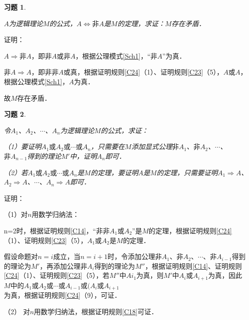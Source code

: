 \documentclass[12pt, a4paper, oneside]{book}
\newtheorem{exer}{习题}
\begin{document}
			\begin{exer}\label{exer9}
				\hfill\par
				$A$为逻辑理论$M$的公式，$A\Leftrightarrow \text{非}A$是$M$的定理，求证：$M$存在矛盾．
			\end{exer}
			证明：
			\par
			$A\Rightarrow \text{非}A$，即$\text{非}A\text{或}\text{非}A$，根据公理模式\ref{Sch1}，“$\text{非}A”$为真．
			\par
			$\text{非}A\Rightarrow A$，即$\text{非}\text{非}A\text{或}$真，根据证明规则\ref{C24}（1）、证明规则\ref{C23}（5），$A\text{或}A$，根据公理模式\ref{Sch1}，$A$为真．
			\par
			故$M$存在矛盾．
	
			\begin{exer}\label{exer10}
				\hfill\par
				令$A_1$、$A_2$、$\cdots$、$A_n$为逻辑理论$M$的公式，求证：
				\par
				（1）要证明$A_1\text{或}A_2\text{或}\cdots\text{或}A_n$，只需要在$M$添加显式公理$\text{非}A_1$、$\text{非}A_2$、$\cdots$、$\text{非}A_{n-1}$得到的理论$M'$中，证明$A_n$即可．
				\par
				（2）若$A_1\text{或}A_2\text{或}\cdots\text{或}A_n$是$M$的定理，要证明$A$是$M$的定理，只需要证明$A_1\Rightarrow A$、$A_2\Rightarrow A$、$\cdots$、$A_n\Rightarrow A$即可．
			\end{exer}
			证明：
			\par
			（1）对$n$用数学归纳法：
			\par
			n=2时，根据证明规则\ref{C14}，“$\text{非}\text{非}A_1\text{或}A_2$”是$M$的定理，根据证明规则\ref{C24}（1）、证明规则\ref{C23}（5），$A_1\text{或}A_2$是$M$的定理．
			\par
			假设命题对$n=i$成立，当$n=i+1$时，令添加公理$\text{非}A_1$、$\text{非}A_2$、$\cdots$、$\text{非}A_{i-1}$得到的理论为$M'$，再添加公理$\text{非}A_i$得到的理论为$M''$，根据证明规则\ref{C14}、证明规则\ref{C24}（1）、证明规则\ref{C23}（5），若$M''$中$Ai_1$为真，则$M'$中$A_i\text{或}A_{i+1}$为真，因此$M$中的$A_1\text{或}A_2\text{或}\cdots\text{或}A_{i-1}\text{或}(A_i\text{或}A_{i+1}$\\为真，根据证明规则\ref{C24}（9），可证．
			\par
			（2）	对$n$用数学归纳法，根据证明规则\ref{C18}可证．
	
\end{document}
